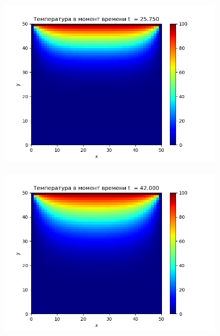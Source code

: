\documentclass[a4paper]{extarticle}
\begin{document}
\begin{figure}[h!]
\begin{subfigure}[b]{0.5\textwidth}
	\includegraphics[width=\textwidth]{hes_pic-206.png}
\end{subfigure}
\hfill
\begin{subfigure}[b]{0.5\textwidth}
	\includegraphics[width=\textwidth]{hes_pic-336.png}
\end{subfigure}


\end{figure}
\end{document}
